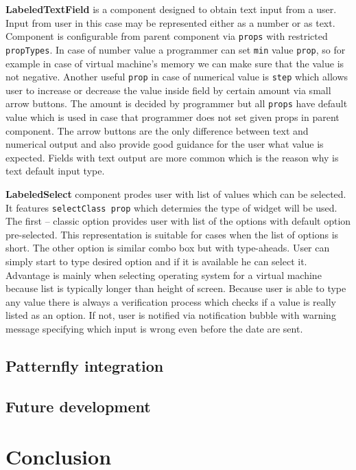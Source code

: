 \textbf{LabeledTextField} is a component designed to obtain text input from a user. Input from user in this case may be represented either as a number or as text. Component is configurable from parent component via \texttt{props} with restricted \texttt{propTypes}.
In case of number value a programmer can set \texttt{min} value \texttt{prop}, so for example in case of virtual machine's memory we can make sure that the value is not negative. Another useful \texttt{prop} in case of numerical value is \texttt{step} which allows user to increase or decrease the value inside field by certain amount via small arrow buttons. The amount is decided by programmer but all \texttt{props} have default value which is used in case that programmer does not set given props in parent component. The arrow buttons are the only difference between text and numerical output and also provide good guidance for the user what value is expected.
Fields with text output are more common which is the reason why is text default  input type. 

\textbf{LabeledSelect} component prodes user with list of values which can be selected. It features \texttt{selectClass prop} which determies the type of widget will be used. 
The first -- classic option provides user with list of the options with default option pre-selected. This representation is suitable for cases when the list of options is short.
The other option is similar combo box but with type-aheads. User can simply start to type desired option and if it is available he can select it. Advantage is mainly when selecting operating system for a virtual machine because list is typically longer than height of screen. Because user is able to type any value there is always a verification process which checks if a value is really listed as an option. If not, user is notified via notification bubble with warning message specifying which input is wrong even before the date are sent.




\section{Patternfly integration}

\section{Future development}

\chapter{Conclusion}

